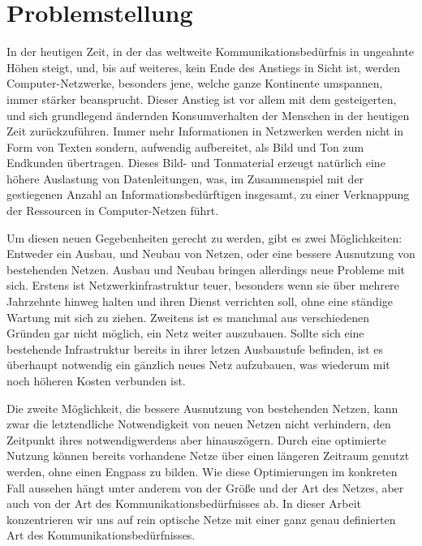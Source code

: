 \chapter{Problemstellung}
In der heutigen Zeit, in der das weltweite Kommunikationsbedürfnis in ungeahnte Höhen steigt, und, bis auf weiteres, kein Ende des Anstiegs in Sicht ist, werden
Computer-Netzwerke, besonders jene, welche ganze Kontinente umspannen, immer stärker beansprucht. Dieser Anstieg ist vor allem mit dem gesteigerten, und sich
grundlegend ändernden Konsumverhalten der Menschen in der heutigen Zeit zurückzuführen. Immer mehr Informationen in Netzwerken werden nicht in Form von Texten
sondern, aufwendig aufbereitet, als Bild und Ton zum Endkunden übertragen. Dieses Bild- und Tonmaterial erzeugt natürlich eine höhere Auslastung von Datenleitungen,
was, im Zusammenspiel mit der gestiegenen Anzahl an Informationsbedürftigen insgesamt, zu einer Verknappung der Ressourcen in Computer-Netzen führt.

Um diesen neuen Gegebenheiten gerecht zu werden, gibt es zwei Möglichkeiten: Entweder ein Ausbau, und Neubau von Netzen, oder eine bessere Ausnutzung von bestehenden
Netzen. Ausbau und Neubau bringen allerdings neue Probleme mit sich. Erstens ist Netzwerkinfrastruktur teuer, besonders wenn sie über mehrere Jahrzehnte hinweg
halten und ihren Dienst verrichten soll, ohne eine ständige Wartung mit sich zu ziehen. Zweitens ist es manchmal aus verschiedenen Gründen gar nicht möglich, 
ein Netz weiter auszubauen. Sollte sich eine bestehende Infrastruktur bereits in ihrer letzen Ausbaustufe befinden, ist es überhaupt notwendig ein gänzlich
neues Netz aufzubauen, was wiederum mit noch höheren Kosten verbunden ist.

Die zweite Möglichkeit, die bessere Ausnutzung von bestehenden Netzen, kann zwar die letztendliche Notwendigkeit von neuen Netzen nicht verhindern, den Zeitpunkt
ihres notwendigwerdens aber hinauszögern. Durch eine optimierte Nutzung können bereits vorhandene Netze über einen längeren Zeitraum genutzt werden, ohne einen
Engpass zu bilden. Wie diese Optimierungen im konkreten Fall aussehen hängt unter anderem von der Größe und der Art des Netzes, aber auch von der Art des
Kommunikationsbedürfnisses ab. In dieser Arbeit konzentrieren wir uns auf rein optische Netze mit einer ganz genau definierten Art des Kommunikationsbedürfnisses.

